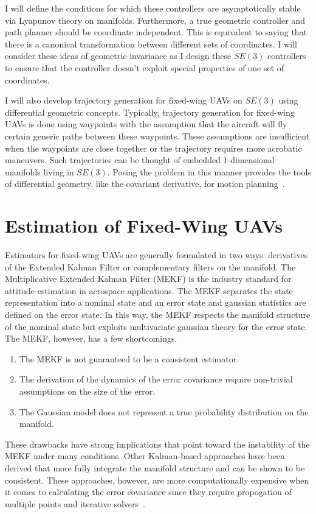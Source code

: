 \documentclass[letterpaper, 10 pt, conference]{ieeeconf}  %
\begin{document}
I will define the conditions for which these controllers are asymptotically stable via Lyapunov theory on manifolds. Furthermore, a true geometric controller and path planner should be coordinate independent. This is equivalent to saying that there is a canonical transformation between different sets of coordinates. I will consider these ideas of geometric invariance as I design these $SE(3)$ controllers to ensure that the controller doesn't exploit special properties of one set of coordinates.

I will also develop trajectory generation for fixed-wing UAVs on $SE(3)$ using differential geometric concepts. Typically, trajectory generation for fixed-wing UAVs is done using waypoints with the assumption that the aircraft will fly certain generic paths between these waypoints. These assumptions are insufficient when the waypoints are close together or the trajectory requires more acrobatic maneuvers. Such trajectories can be thought of embedded 1-dimensional manifolds living in $SE(3)$. Posing the problem in this manner provides the tools of differential geometry, like the covariant derivative, for motion planning~\cite{Zhang2007Robot}.


\section{Estimation of Fixed-Wing UAVs}
Estimators for fixed-wing UAVs are generally formulated in two ways: derivatives of the Extended Kalman Filter or complementary filters on the manifold.
The Multiplicative Extended Kalman Filter (MEKF) is the industry standard for attitude estimation in aerospace applications. The MEKF separates the state representation into a nominal state and an error state and gaussian statistics are defined on the error state. In this way, the MEKF respects the manifold structure of the nominal state but exploits multivariate gaussian theory for the error state. The MEKF, however, has a few shortcomings.
\begin{enumerate}
  \item The MEKF is not guaranteed to be a consistent estimator.
  \item The derivation of the dynamics of the error covariance require non-trivial assumptions on the size of the error.
  \item The Gaussian model does not represent a true probability distribution on the manifold.
\end{enumerate}
These drawbacks have strong implications that point toward the instability of the MEKF under many conditions. Other Kalman-based approaches have been derived that more fully integrate the manifold structure and can be shown to be consistent. These approaches, however, are more computationally expensive when it comes to calculating the error covariance since they require propogation of multiple points and iterative solvers~\cite{Hertzberg2013Integrating}.
\end{document}
